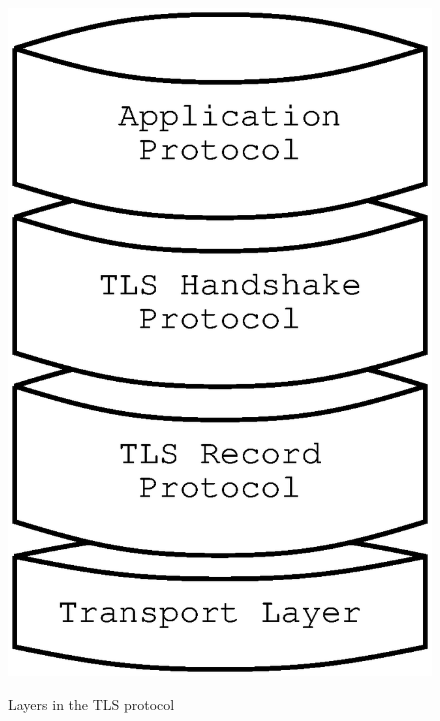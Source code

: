 \begin{figure}[hbtp]
\includegraphics{layers}
\label{fig:layers}
\caption{Layers in the TLS protocol}
\end{figure}


\addvspace{1.5cm}


